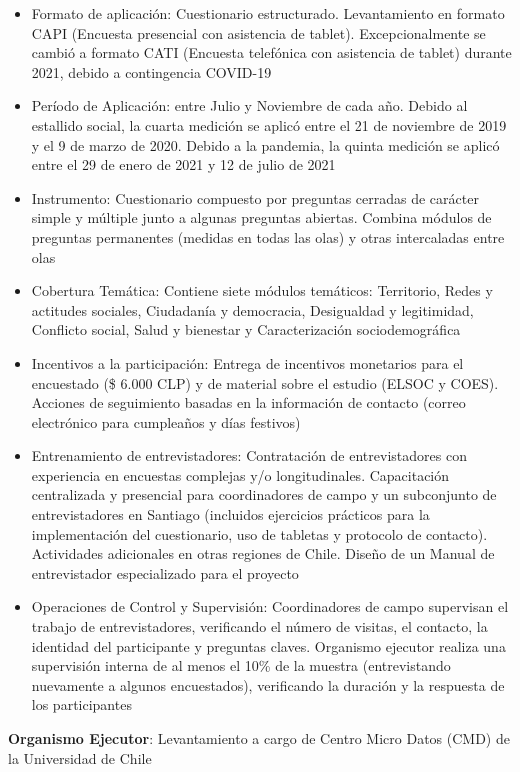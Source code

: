 \documentclass[
  12pt,
  openany]{book}
\begin{document}
\begin{itemize}
\item
  Formato de aplicación: Cuestionario estructurado. Levantamiento en formato CAPI (Encuesta presencial con asistencia de tablet). Excepcionalmente se cambió a formato CATI (Encuesta telefónica con asistencia de tablet) durante 2021, debido a contingencia COVID-19
\item
  Período de Aplicación: entre Julio y Noviembre de cada año. Debido al estallido social, la cuarta medición se aplicó entre el 21 de noviembre de 2019 y el 9 de marzo de 2020. Debido a la pandemia, la quinta medición se aplicó entre el 29 de enero de 2021 y 12 de julio de 2021
\item
  Instrumento: Cuestionario compuesto por preguntas cerradas de carácter simple y múltiple junto a algunas preguntas abiertas. Combina módulos de preguntas permanentes (medidas en todas las olas) y otras intercaladas entre olas
\item
  Cobertura Temática: Contiene siete módulos temáticos: Territorio, Redes y actitudes sociales, Ciudadanía y democracia, Desigualdad y legitimidad, Conflicto social, Salud y bienestar y Caracterización sociodemográfica
\item
  Incentivos a la participación: Entrega de incentivos monetarios para el encuestado (\$ 6.000 CLP) y de material sobre el estudio (ELSOC y COES). Acciones de seguimiento basadas en la información de contacto (correo electrónico para cumpleaños y días festivos)
\item
  Entrenamiento de entrevistadores: Contratación de entrevistadores con experiencia en encuestas complejas y/o longitudinales. Capacitación centralizada y presencial para coordinadores de campo y un subconjunto de entrevistadores en Santiago (incluidos ejercicios prácticos para la implementación del cuestionario, uso de tabletas y protocolo de contacto). Actividades adicionales en otras regiones de Chile. Diseño de un Manual de entrevistador especializado para el proyecto
\item
  Operaciones de Control y Supervisión: Coordinadores de campo supervisan el trabajo de entrevistadores, verificando el número de visitas, el contacto, la identidad del participante y preguntas claves. Organismo ejecutor realiza una supervisión interna de al menos el 10\% de la muestra (entrevistando nuevamente a algunos encuestados), verificando la duración y la respuesta de los participantes
\end{itemize}

\textbf{Organismo Ejecutor}: Levantamiento a cargo de Centro Micro Datos (CMD) de la Universidad de Chile
\end{document}
